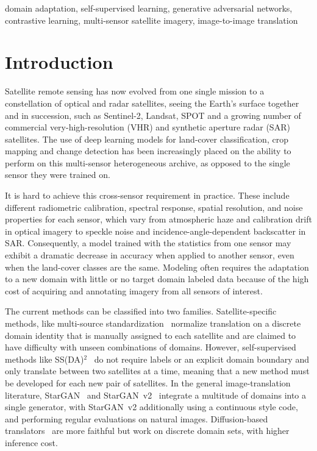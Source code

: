 \documentclass[conference]{IEEEtran}
\begin{document}
\begin{IEEEkeywords}
domain adaptation, self-supervised learning, generative adversarial networks, contrastive learning, multi-sensor satellite imagery, image-to-image translation
\end{IEEEkeywords}

\section{Introduction}

Satellite remote sensing has now evolved from one single mission to a constellation of optical and radar satellites, seeing the Earth's surface together and in succession, such as Sentinel-2, Landsat, SPOT and a growing number of commercial very-high-resolution (VHR) and synthetic aperture radar (SAR) satellites. The use of deep learning models for land-cover classification, crop mapping and change detection has been increasingly placed on the ability to perform on this multi-sensor heterogeneous archive, as opposed to the single sensor they were trained on.

It is hard to achieve this cross-sensor requirement in practice. These include different radiometric calibration, spectral response, spatial resolution, and noise properties for each sensor, which vary from atmospheric haze and calibration drift in optical imagery to speckle noise and incidence-angle-dependent backscatter in SAR. Consequently, a model trained with the statistics from one sensor may exhibit a dramatic decrease in accuracy when applied to another sensor, even when the land-cover classes are the same. Modeling often requires the adaptation to a new domain with little or no target domain labeled data because of the high cost of acquiring and annotating imagery from all sensors of interest.

The current methods can be classified into two families. Satellite-specific methods, like multi-source standardization~\cite{tasar2020standardgan} normalize translation on a discrete domain identity that is manually assigned to each satellite and are claimed to have difficulty with unseen combinations of domains. However, self-supervised methods like SS(DA)$^2$~\cite{zhang2023ssdada} do not require labels or an explicit domain boundary and only translate between two satellites at a time, meaning that a new method must be developed for each new pair of satellites. In the general image-translation literature, StarGAN~\cite{choi2018stargan} and StarGAN~v2~\cite{choi2020starganv2} integrate a multitude of domains into a single generator, with StarGAN~v2 additionally using a continuous style code, and performing regular evaluations on natural images. Diffusion-based translators~\cite{vinholi2024multisensor,kieu2025universal} are more faithful but work on discrete domain sets, with higher inference cost.
\end{document}
